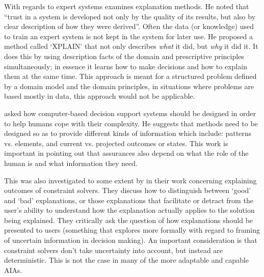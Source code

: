     With regards to expert systems \citet{Swartout1983-ko} examines explanation methods. He noted that ``trust in a system is developed not only by the quality of its results, but also by clear description of how they were derived''. Often the data (or knowledge) used to train an expert system is not kept in the system for later use. He proposed a method called `XPLAIN' that not only describes \emph{what} it did, but \emph{why} it did it. It does this by using description facts of the domain and prescriptive principles simultaneously; in essence it learns how to make decisions and how to explain them at the same time. This approach is meant for a  structured problem defined by a domain model and the domain principles, in situations where problems are based mostly in data, this approach would not be applicable.

    \citet{Rouse1986-dz} asked how computer-based decision support systems should be designed in order to help humans cope with their complexity. He suggests that methods need to be designed so as to provide different kinds of information which include: patterns vs. elements, and current vs. projected outcomes or states. This work is important in pointing out that assurances also depend on what the role of the human is and what information they need.

    This was also investigated to some extent by \citet{Wallace2001-fm} in their work concerning explaining outcomes of constraint solvers. They discuss how to distinguish between `good' and `bad' explanations, or those explanations that facilitate or detract from the user's ability to understand how the explanation actually applies to the solution being explained. They critically ask the question of how explanations should be presented to users (something that \citet{Kuhn1997-qc} explores more formally with regard to framing of uncertain information in decision making). An important consideration is that constraint solvers don't take uncertainty into account, but instead are deterministic. This is not the case in many of the more adaptable and capable AIAs.

